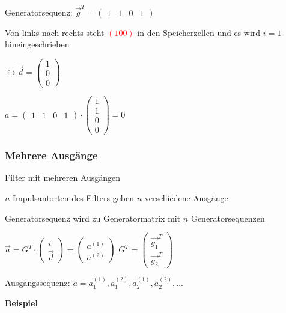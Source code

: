 Generatorsequenz: $\displaystyle{\vec{g}^T =
    \begin{pmatrix}
        1 & 1 & 0 & 1
    \end{pmatrix}
}$

Von links nach rechts steht \textcolor{red}{$ (1 0 0) $} in den Speicherzellen und es wird $i = 1$ hineingeschrieben

$\displaystyle{
    \hookrightarrow \vec{d} = \begin{pmatrix}
        1\\
        0\\
        0
    \end{pmatrix}
}$

$\displaystyle{
    a = \begin{pmatrix}
        1 & 1 & 0 & 1
    \end{pmatrix}
    \cdot
    \begin{pmatrix}
        1\\
        1\\
        0\\
        0
    \end{pmatrix}
    = 0    
}$

\subsubsection{Mehrere Ausgänge}

Filter mit mehreren Ausgängen

$n$ Impulsantorten des Filters geben $n$ verschiedene Ausgänge

Generatorsequenz wird zu Generatormatrix mit $n$ Generatorsequenzen

$\displaystyle{
    \vec{a} = G^T \cdot
    \begin{pmatrix}
        i\\
        \vec{d}
    \end{pmatrix} =
    \begin{pmatrix}
        a^{(1)}\\
        a^{(2)}
    \end{pmatrix}
}$\;\;\;\;\;\;\;\;\;\;\;\;\;
$\displaystyle{
    G^T =
    \begin{pmatrix}
        \vec{g_1}^T\\
        \vec{g_2}^T
    \end{pmatrix}
}$

Ausgangssequenz: $a = a^{(1)}_1, a^{(2)}_1, a^{(1)}_2, a^{(2)}_2, ...$

\textbf{Beispiel}

